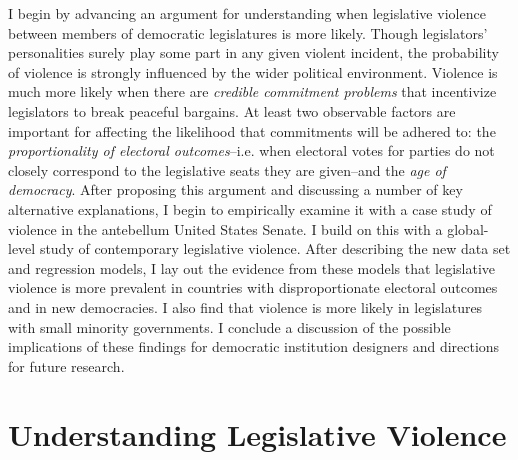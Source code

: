 \documentclass[a4paper]{article}\usepackage[]{graphicx}\usepackage[]{color}
\begin{document}
I begin by advancing an argument for understanding when legislative violence between members of democratic legislatures is more likely. Though legislators' personalities surely play some part in any given violent incident, the probability of violence is strongly influenced by the wider political environment. Violence is much more likely when there are \emph{credible commitment problems} that incentivize legislators to break peaceful bargains. At least two observable factors are important for affecting the likelihood that commitments will be adhered to: the \emph{proportionality of electoral outcomes}--i.e. when electoral votes for parties do not closely correspond to the legislative seats they are given--and the \emph{age of democracy}. After proposing this argument and discussing a number of key alternative explanations, I begin to empirically examine it with a case study of violence in the antebellum United States Senate. I build on this with a global-level study of contemporary legislative violence. After describing the new data set and regression models, I lay out the evidence from these models that legislative violence is more prevalent in countries with disproportionate electoral outcomes and in new democracies. I also find that violence is more likely in legislatures with small minority governments. I conclude a discussion of the possible implications of these findings for democratic institution designers and directions for future research.


\section*{Understanding Legislative Violence}
\end{document}
